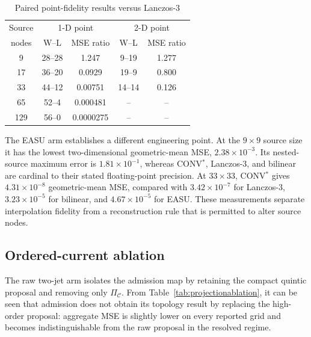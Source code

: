 \documentclass[journal]{IEEEtran}
\begin{document}
\begin{table}[H]
\caption{Paired point-fidelity results versus Lanczos-3}
\label{tab:pairedfidelity}
\centering
\scriptsize
\setlength{\tabcolsep}{3.0pt}
\begin{tabular}{c|cc|cc}
\hline
Source & \multicolumn{2}{c|}{1-D point} &
\multicolumn{2}{c}{2-D point} \\
nodes & W--L & MSE ratio & W--L & MSE ratio \\
\hline
9   & 28--28 & 1.247 & 9--19  & 1.277 \\
17  & 36--20 & 0.0929 & 19--9 & 0.800 \\
33  & 44--12 & 0.00751 & 14--14 & 0.126 \\
65  & 52--4  & 0.000481 & -- & -- \\
129 & 56--0  & 0.0000275 & -- & -- \\
\hline
\end{tabular}
\end{table}

The EASU arm establishes a different engineering point. At the $9\times9$
source size it has the lowest two-dimensional geometric-mean MSE,
$2.38\times10^{-3}$. Its nested-source maximum error is $1.81\times10^{-1}$,
whereas CONV$^{*}$, Lanczos-3, and bilinear are cardinal to their stated
floating-point precision. At $33\times33$, CONV$^{*}$ gives
$4.31\times10^{-8}$ geometric-mean MSE, compared
with $3.42\times10^{-7}$ for Lanczos-3, $3.23\times10^{-5}$ for bilinear,
and $4.67\times10^{-5}$ for EASU. These measurements separate interpolation
fidelity from a reconstruction rule that is permitted to alter source nodes.

\subsection{Ordered-current ablation}

The raw two-jet arm isolates the admission map by retaining the compact
quintic proposal and removing only \(\Pi_{\mathcal C}\). From
Table~\ref{tab:projectionablation}, it can be seen that admission does not
obtain its topology result by replacing the high-order proposal: aggregate
MSE is slightly lower on every reported grid and becomes indistinguishable
from the raw proposal in the resolved regime.
\end{document}
